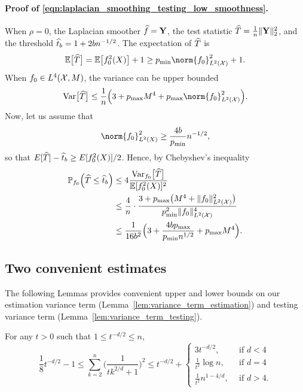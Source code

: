 \paragraph{Proof of \eqref{eqn:laplacian_smoothing_testing_low_smoothness}.}
When $\rho = 0$, the Laplacian smoother $\widehat{f} = \mathbf{Y}$, the test statistic $\widehat{T} = \frac{1}{n}\|\mathbf{Y}\|_2^2$, and the threshold $\widehat{t}_b = 1 + 2bn^{-1/2}$. The expectation of $\widehat{T}$ is 
\begin{equation*}
\Ebb\bigl[\wh{T}\bigr] = \mathbb{E}\bigl[f_0^2(X)\bigr] + 1 \geq p_{\min} \norm{f_0}_{\Leb^2(\Xset)}^2 + 1.
\end{equation*}
When $f_0 \in L^4(\mathcal{X},M)$, the variance can be upper bounded
\begin{equation*}
\Var\bigl[\wh{T}\bigr] \leq \frac{1}{n}\Bigl(3 + p_{\max} M^4 + p_{\max}\norm{f_0}_{\Leb^2(\Xset)}^2\Bigr).
\end{equation*}
Now, let us assume that
\begin{equation*}
\norm{f_0}_{\Leb^2(X)}^2 \geq \frac{4b}{p_{\min}} n^{-1/2},
\end{equation*}
so that $E[\widehat{T}] - \widehat{t}_b \geq E[f_0^2(X)]/2$. Hence, by Chebyshev's inequality
\begin{align*}
\mathbb{P}_{f_0}\Bigl(\widehat{T} \leq \widehat{t}_b \Bigr) & \leq 4 \frac{\mathrm{Var}_{f_0}\bigl[\widehat{T}\bigr]}{\mathbb{E}[f_0^2(X)]^2} \\
& \leq \frac{4}{n} \cdot \frac{ 3 + p_{\max}\bigl(M^4 + \|f_0\|_{L^2(\mathcal{X})}^2 \bigr)}{p_{\min}^2 \|f_0\|_{L^2(\mathcal{X})}^4} \\
& \leq \frac{1}{16b^2}\Bigl(3 + \frac{4bp_{\max}}{p_{\min}n^{1/2}} + p_{\max}M^4\Bigr).
\end{align*}

\subsection{Two convenient estimates}
\label{subsec:convenient_estimate}

The following Lemmas provides convenient upper and lower bounds on our estimation variance term (Lemma~\ref{lem:variance_term_estimation}) and testing variance term (Lemma~\ref{lem:variance_term_testing}).
\begin{lemma}
	\label{lem:variance_term_estimation}
	For any $t > 0$ such that $1 \leq t^{-d/2} \leq n$,
	\begin{equation*}
	\frac{1}{8}t^{-d/2} - 1 \leq \sum_{k = 2}^{n} \biggl(\frac{1}{tk^{2/d} + 1}\biggr)^2 \leq t^{-d/2} +
	\begin{cases*}
	3t^{-d/2},& ~~\textrm{if $d < 4$} \\
	\frac{1}{t^2}\log n,& ~~\textrm{if $d = 4$} \\
	\frac{1}{t^2}n^{1 - 4/d},&~~\textrm{if $d > 4$.}
	\end{cases*}
	\end{equation*}
\end{lemma}

